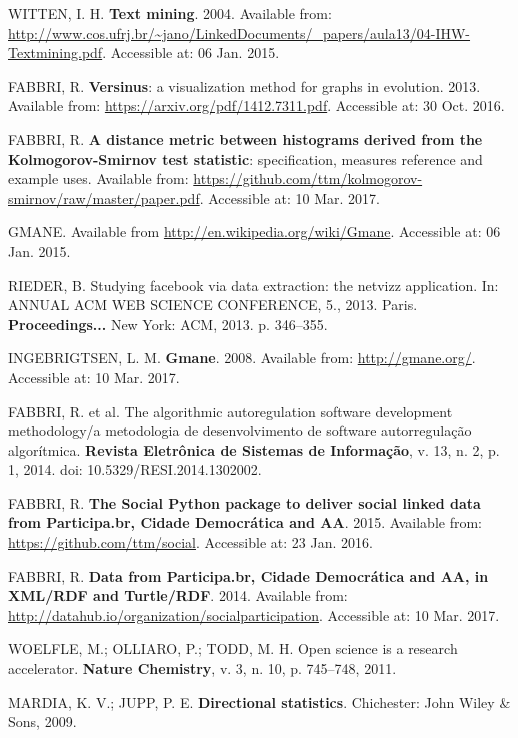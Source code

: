 \documentclass[
12pt,		%
openright,	%
twoside,  %
a4paper,			%
chapter=TITLE,		%
english,			%
french,				%
spanish,			%
brazil				%
]{USPSC}
\begin{document}
\begin{thebibliography}{999}
	WITTEN, I. H. \textbf{Text mining}. 2004. Available from: \url{http://www.cos.ufrj.br/~jano/LinkedDocuments/_papers/aula13/04-IHW-Textmining.pdf}. Accessible at: 06 Jan. 2015.

	FABBRI, R. \textbf{Versinus}: a visualization method for graphs in evolution. 2013. Available from: \url{https://arxiv.org/pdf/1412.7311.pdf}. Accessible at: 30 Oct. 2016.

	FABBRI, R. \textbf{A distance metric between histograms derived from the Kolmogorov-Smirnov test statistic}: specification, measures reference and example uses. Available from: \url{https://github.com/ttm/kolmogorov-smirnov/raw/master/paper.pdf}. Accessible at: 10 Mar. 2017.

	GMANE. Available from \url{http://en.wikipedia.org/wiki/Gmane}. Accessible at: 06 Jan. 2015.

	RIEDER, B. Studying facebook via data extraction: the netvizz application. In: ANNUAL ACM WEB SCIENCE CONFERENCE, 5., 2013. Paris. \textbf{Proceedings...} New York: ACM, 2013. p. 346–355.

	INGEBRIGTSEN, L. M. \textbf{Gmane}. 2008. Available from: \url{http://gmane.org/}. Accessible at: 10 Mar. 2017.

	FABBRI, R. et al. The algorithmic autoregulation software development methodology/a metodologia de desenvolvimento de software autorregulação algorítmica. \textbf{Revista Eletrônica de Sistemas de Informação}, v. 13, n. 2, p. 1, 2014. doi: 10.5329/RESI.2014.1302002.

	FABBRI, R. \textbf{The Social Python package to deliver social linked data from Participa.br, Cidade Democrática and AA}. 2015. Available from: \url{https://github.com/ttm/social}. Accessible at: 23 Jan. 2016.

	FABBRI, R. \textbf{Data from Participa.br, Cidade Democrática and AA, in XML/RDF and Turtle/RDF}. 2014. Available from: \url{http://datahub.io/organization/socialparticipation}. Accessible at: 10 Mar. 2017.

	WOELFLE, M.; OLLIARO, P.; TODD, M. H. Open science is a research accelerator. \textbf{Nature Chemistry}, v. 3, n. 10, p. 745–748, 2011.

	MARDIA, K. V.; JUPP, P. E. \textbf{Directional statistics}. Chichester: John Wiley \& Sons, 2009.


\end{thebibliography}
\end{document}
